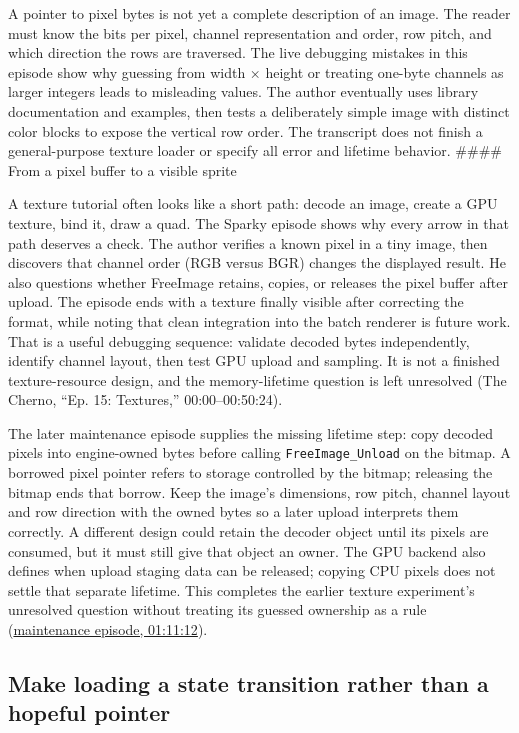 A pointer to pixel bytes is not yet a complete description of an image. The reader must know the bits per pixel, channel representation and order, row pitch, and which direction the rows are traversed. The live debugging mistakes in this episode show why guessing from width × height or treating one-byte channels as larger integers leads to misleading values. The author eventually uses library documentation and examples, then tests a deliberately simple image with distinct color blocks to expose the vertical row order. The transcript does not finish a general-purpose texture loader or specify all error and lifetime behavior. \#\#\#\# From a pixel buffer to a visible sprite

A texture tutorial often looks like a short path: decode an image, create a GPU texture, bind it, draw a quad. The Sparky episode shows why every arrow in that path deserves a check. The author verifies a known pixel in a tiny image, then discovers that channel order (RGB versus BGR) changes the displayed result. He also questions whether FreeImage retains, copies, or releases the pixel buffer after upload. The episode ends with a texture finally visible after correcting the format, while noting that clean integration into the batch renderer is future work. That is a useful debugging sequence: validate decoded bytes independently, identify channel layout, then test GPU upload and sampling. It is not a finished texture-resource design, and the memory-lifetime question is left unresolved (The Cherno, ``Ep. 15: Textures,'' 00:00--00:50:24).

The later maintenance episode supplies the missing lifetime step: copy decoded pixels into engine-owned bytes before calling \texttt{FreeImage\_Unload} on the bitmap. A borrowed pixel pointer refers to storage controlled by the bitmap; releasing the bitmap ends that borrow. Keep the image's dimensions, row pitch, channel layout and row direction with the owned bytes so a later upload interprets them correctly. A different design could retain the decoder object until its pixels are consumed, but it must still give that object an owner. The GPU backend also defines when upload staging data can be released; copying CPU pixels does not settle that separate lifetime. This completes the earlier texture experiment's unresolved question without treating its guessed ownership as a rule (\href{https://www.youtube.com/watch?v=CKhGMoTNPOo&t=4272}{maintenance episode, 01:11:12}).

\subsection{Make loading a state transition rather than a hopeful pointer}\label{06-engine-ii-ch027-make-loading-a-state-transition-rather-than-a-hopeful-pointer}

